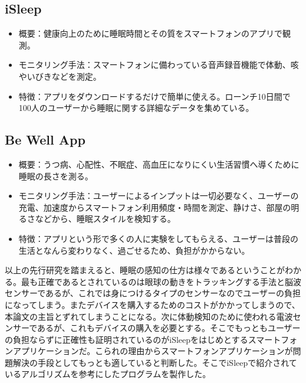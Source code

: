 \subsection{iSleep}
\begin{itemize}
\item 概要：健康向上のために睡眠時間とその質をスマートフォンのアプリで観測。
\item モニタリング手法：スマートフォンに備わっている音声録音機能で体動、咳やいびきなどを測定。 \cite{iSleep}
\item 特徴：アプリをダウンロードするだけで簡単に使える。ローンチ10日間で100人のユーザーから睡眠に関する詳細なデータを集めている。
\end{itemize}

\subsection{Be Well App}
\begin{itemize}
\item 概要：うつ病、心配性、不眠症、高血圧になりにくい生活習慣へ導くために睡眠の長さを測る。
\item モニタリング手法：ユーザーによるインプットは一切必要なく、ユーザーの充電、加速度からスマートフォン利用頻度・時間を測定、静けさ、部屋の明るさなどから、睡眠スタイルを検知する。\cite{beWellApp}
\item 特徴：アプリという形で多くの人に実験をしてもらえる、ユーザーは普段の生活となんら変わりなく、過ごせるため、負担がかからない。
\end{itemize}

以上の先行研究を踏まえると、睡眠の感知の仕方は様々であるということがわかる。最も正確であるとされているのは眼球の動きをトラッキングする手法と脳波センサーであるが、これでは身につけるタイプのセンサーなのでユーザーの負担になってしまう。またデバイスを購入するためのコストがかかってしまうので、本論文の主旨とずれてしまうことになる。次に体動検知のために使われる電波センサーであるが、これもデバイスの購入を必要とする。そこでもっともユーザーの負担ならずに正確性も証明されているのがiSleepをはじめとするスマートフォンアプリケーションだ。こられの理由からスマートフォンアプリケーションが問題解決の手段としてもっとも適していると判断した。そこでiSleepで紹介されているアルゴリズムを参考にしたプログラムを製作した。

